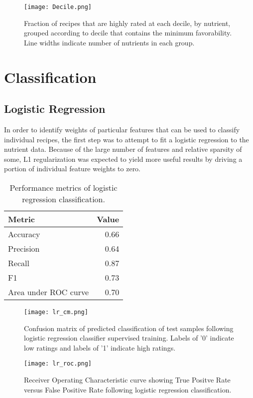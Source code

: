 \documentclass[]{scrartcl}
\begin{document}
\begin{figure}
	\centering
	\texttt{[image: Decile.png]}
	\caption{Fraction of recipes that are highly rated at each decile, by nutrient, grouped according to decile that contains the minimum favorability.  Line widths indicate number of nutrients in each group. \label{fig:Deciles}}
\end{figure}

\section*{Classification}
\subsection*{Logistic Regression}
In order to identify weights of particular features that can be used to classify individual recipes, the first step was to attempt to fit a logistic regression to the nutrient data.  Because of the large number of features and relative sparsity of some, L1 regularization was expected to yield more useful results by driving a portion of individual feature weights to zero.  

\begin{table}
	\centering
	\caption{Performance metrics of logistic regression classification.\label{tab:lr_metrics}}
	\begin{tabular}{lr}
		\textbf{Metric} & \textbf{Value} \\
		\hline
		Accuracy &  0.66 \\
		Precision & 0.64 \\
		Recall & 0.87 \\
		F1 & 0.73 \\
		Area under ROC curve & 0.70 \\	
	\end{tabular}
\end{table}
\begin{figure}
	\centering
	\texttt{[image: lr\_cm.png]}
	\caption{Confusion matrix of predicted classification of test samples following logistic regression classifier supervised training. Labels of '0' indicate low ratings and labels of '1' indicate high ratings.\label{fig:lr_cm}}
\end{figure}

\begin{figure}
	\centering
	\texttt{[image: lr\_roc.png]}
	\caption{Receiver Operating Characteristic curve showing True Positve Rate versus False Positive Rate following logistic regression classification.  \label{fig:lr_roc}}
\end{figure}
\end{document}
